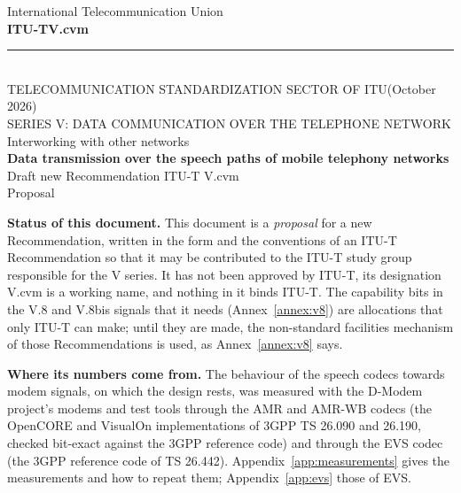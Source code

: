 \documentclass[a4paper,11pt]{article}
\newcommand{\recname}{V.cvm}
\newcommand{\rectitle}{Data transmission over the speech paths of mobile telephony networks}
\newcommand{\docdate}{October 2026}
\newcounter{annex}
\begin{document}
\thispagestyle{plain}
\begin{center}
\vspace*{1.0cm}
{\large International Telecommunication Union}\\[0.3cm]
{\Large\bfseries ITU-T}\hfill{\Large\bfseries\recname}\\[-0.2cm]
\rule{\textwidth}{0.6pt}\\[-0.1cm]
{\small TELECOMMUNICATION STANDARDIZATION SECTOR OF ITU\hfill(\docdate)}\\[1.2cm]
{\small SERIES V: DATA COMMUNICATION OVER THE TELEPHONE NETWORK}\\[0.2cm]
{\small Interworking with other networks}\\[1.6cm]
{\LARGE\bfseries\rectitle}\\[2.0cm]
{\large Draft new Recommendation ITU-T \recname}\\[0.4cm]
{\normalsize Proposal}\\[2.4cm]
\end{center}
\begin{minipage}{0.92\textwidth}\small
\textbf{Status of this document.}  This document is a \emph{proposal} for a new
Recommendation, written in the form and the conventions of an ITU-T
Recommendation so that it may be contributed to the ITU-T study group
responsible for the V series.  It has not been approved by ITU-T, its
designation \recname{} is a working name, and nothing in it binds ITU-T.
The capability bits in the V.8 and V.8bis signals that it needs
(Annex~\ref{annex:v8}) are allocations that only ITU-T can make; until
they are made, the non-standard facilities mechanism of those
Recommendations is used, as Annex~\ref{annex:v8} says.

\medskip
\textbf{Where its numbers come from.}  The behaviour of the speech codecs
towards modem signals, on which the design rests, was measured with the
D-Modem project's modems and test tools through the AMR and AMR-WB codecs
(the OpenCORE and VisualOn implementations of 3GPP TS 26.090 and 26.190,
checked bit-exact against the 3GPP reference code) and through the EVS
codec (the 3GPP reference code of TS 26.442).  Appendix~\ref{app:measurements}
gives the measurements and how to repeat them; Appendix~\ref{app:evs}
those of EVS.
\end{minipage}
\vfill
\clearpage

\thispagestyle{plain}
\end{document}
